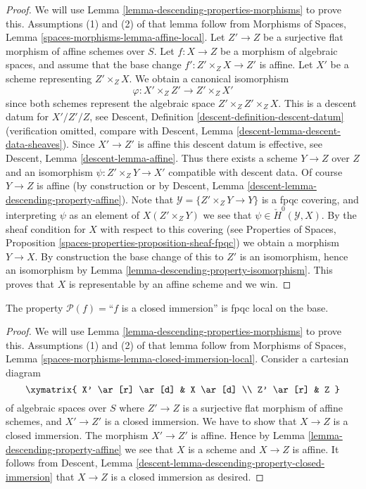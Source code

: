 \begin{proof}
We will use
Lemma \ref{lemma-descending-properties-morphisms}
to prove this. Assumptions (1) and (2) of that lemma follow from
Morphisms of Spaces,
Lemma \ref{spaces-morphisms-lemma-affine-local}.
Let $Z' \to Z$ be a surjective flat morphism of affine schemes over $S$.
Let $f : X \to Z$ be a morphism of algebraic spaces, and assume
that the base change $f' : Z' \times_Z X \to Z'$ is affine.
Let $X'$ be a scheme representing $Z' \times_Z X$.
We obtain a canonical isomorphism
$$
\varphi : X' \times_Z Z' \longrightarrow Z' \times_Z X'
$$
since both schemes represent the algebraic space $Z' \times_Z Z' \times_Z X$.
This is a descent datum for $X'/Z'/Z$, see
Descent, Definition \ref{descent-definition-descent-datum}
(verification omitted, compare with
Descent, Lemma \ref{descent-lemma-descent-data-sheaves}).
Since $X' \to Z'$ is affine this descent datum is effective, see
Descent, Lemma \ref{descent-lemma-affine}.
Thus there exists a scheme $Y \to Z$ over $Z$ and an
isomorphism $\psi : Z' \times_Z Y \to X'$ compatible with descent data.
Of course $Y \to Z$ is affine (by construction or by
Descent, Lemma \ref{descent-lemma-descending-property-affine}).
Note that $\mathcal{Y} = \{Z' \times_Z Y \to Y\}$ is a
fpqc covering, and interpreting $\psi$ as an element of
$X(Z' \times_Z Y)$ we see that $\psi \in \check{H}^0(\mathcal{Y}, X)$.
By the sheaf condition for $X$ with respect to this covering (see
Properties of Spaces, Proposition
\ref{spaces-properties-proposition-sheaf-fpqc})
we obtain a morphism $Y \to X$.
By construction the base change of this to $Z'$ is an isomorphism, hence
an isomorphism by
Lemma \ref{lemma-descending-property-isomorphism}.
This proves that $X$ is representable by an affine scheme and we win.
\end{proof}

\begin{lemma}
\label{lemma-descending-property-closed-immersion}
The property $\mathcal{P}(f) =$``$f$ is a closed immersion''
is fpqc local on the base.
\end{lemma}

\begin{proof}
We will use
Lemma \ref{lemma-descending-properties-morphisms}
to prove this. Assumptions (1) and (2) of that lemma follow from
Morphisms of Spaces,
Lemma \ref{spaces-morphisms-lemma-closed-immersion-local}.
Consider a cartesian diagram
$$
\xymatrix{
X' \ar[r] \ar[d] & X \ar[d] \\
Z' \ar[r] & Z
}
$$
of algebraic spaces over $S$
where $Z' \to Z$ is a surjective flat morphism of affine schemes,
and $X' \to Z'$ is a closed immersion. We have to show that $X \to Z$
is a closed immersion. The morphism $X' \to Z'$ is affine. Hence by
Lemma \ref{lemma-descending-property-affine}
we see that $X$ is a scheme and $X \to Z$ is affine.
It follows from
Descent, Lemma \ref{descent-lemma-descending-property-closed-immersion}
that $X \to Z$ is a closed immersion as desired.
\end{proof}

